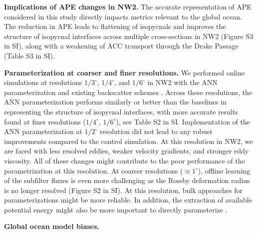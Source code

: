 \documentclass[draft]{agujournal2019}
\begin{document}
\textbf{Implications of APE changes in NW2.} 
The accurate representation of APE considered in this study directly impacts metrics relevant to the global ocean. The reduction in APE leads to flattening of isopycnals and improves the structure of isopycnal interfaces across multiple cross-sections in NW2 (Figure S3 in SI), along with a weakening of ACC transport through the Drake Passage (Table S3 in SI).

\textbf{Parameterization at coarser and finer resolutions. } %
We performed online simulations at resolutions $1/3^\circ$, $1/4^\circ$, and $1/6^\circ$ in NW2 with the ANN parameterization and existing backscatter schemes \cite{yankovsky2024, perezhogin2024stable}. Across these resolutions, the ANN parameterization performs similarly or better than the baselines in representing the structure of isopycnal interfaces, with more accurate results found at finer resolutions ($1/4^\circ$, $1/6^\circ$), see Table S2 in SI. Implementation of the ANN parameterization at $1/2^\circ$ resolution did not lead to any robust improvements compared to the control simulation.  At this resolution in NW2, we are faced with less resolved eddies, weaker velocity gradients, and stronger eddy viscosity. All of these changes might contribute to the poor performance of the parametrization at this resolution.  %
At coarser resolutions ($\approx 1^\circ$), offline learning of the subfilter fluxes is even more challenging as the  Rossby deformation radius is no longer resolved (Figure S2 in SI). At this resolution, bulk approaches for parameterizations might be more reliable. In addition, the extraction of available potential energy might also be more important to directly parameterize \cite{bachman2019gm, jansen2019toward, grooms2024stochastic, perezhogin2025large}. 


\textbf{Global ocean model biases.} \\
\end{document}
